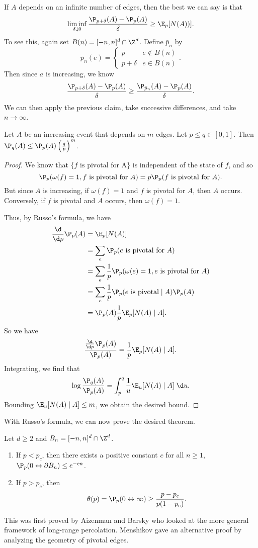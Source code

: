 \documentclass[a4paper]{article}
\begin{document}
If $A$ depends on an infinite number of edges, then the best we can say is that
\[
  \liminf_{\delta \downarrow 0} \frac{\P_{p + \delta}(A) - \P_p(A)}{\delta} \geq \E_p[N(A))].
\]
To see this, again set $B(n) = [-n, n]^d \cap \Z^d$. Define $\bar{p}_n$ by
\[
  \bar{p}_n(e) =
  \begin{cases}
    p & e \not \in B(n)\\
    p + \delta & e \in B(n)
  \end{cases}.
\]
Then since $a$ is increasing, we know
\[
  \frac{\P_{p + \delta}(A) - \P_p(A)}{\delta} \geq \frac{\P_{\bar{p}_n} (A) - \P_p(A)}{\delta}.
\]
We can then apply the previous claim, take successive differences, and take $n \to \infty$.

\begin{cor}
  Let $A$ be an increasing event that depends on $m$ edges. Let $p \leq q \in [0, 1]$. Then $\P_q(A) \leq \P_p(A) \left(\frac{q}{p}\right)^m$.
\end{cor}

\begin{proof}
  We know that $\{f\text{ is pivotal for A}\}$ is independent of the state of $f$, and so
  \[
    \P_p(\omega(f) = 1, f\text{ is pivotal for $A$}) = p\P_p(f\text{ is pivotal for $A$}).
  \]
  But since $A$ is increasing, if $\omega(f) = 1$ and $f$ is pivotal for $A$, then $A$ occurs. Conversely, if $f$ is pivotal and $A$ occurs, then $\omega(f) = 1$.

  Thus, by Russo's formula, we have
  \begin{align*}
    \frac{\d}{\d p} \P_p(A) &= \E_p[N(A)] \\
    &= \sum_e \P_p(e\text{ is pivotal for $A$})\\
    &= \sum_e \frac{1}{p}\P_p(\omega(e) = 1,\text{$e$ is pivotal for $A$})\\
    &= \sum_e \frac{1}{p}\P_p(\text{$e$ is pivotal} \mid A) \P_p(A)\\
    &= \P_p(A) \frac{1}{p} \E_p[N(A) \mid A].
  \end{align*}
  So we have
  \[
    \frac{\frac{\d}{\d p} \P_p(A)}{\P_p(A)} = \frac{1}{p} \E_p[N(A) \mid A].
  \]
  Integrating, we find that
  \[
    \log \frac{\P_q(A)}{\P_p(A)} = \int_{p}^q \frac{1}{u} \E_u[N(A) \mid A]\;\d u.
  \]
  Bounding $\E_u [N(A) \mid A] \leq m$, we obtain the desired bound.
\end{proof}

With Russo's formula, we can now prove the desired theorem.
\begin{thm}
  Let $d \geq 2$ and $B_n = [-n, n]^d \cap \Z^d$.
  \begin{enumerate}
    \item If $p < p_c$, then there exists a positive constant $c$ for all $n \geq 1$, $\P_p(0 \leftrightarrow \partial B_n) \leq e^{-cn}$.
    \item If $p > p_c$, then
      \[
        \theta(p) = \P_p(0 \leftrightarrow \infty) \geq \frac{p - p_c}{p(1 - p_c)}.
      \]
  \end{enumerate}
\end{thm}
This was first proved by Aizenman and Barsky who looked at the more general framework of long-range percolation. Menshikov gave an alternative proof by analyzing the geometry of pivotal edges.
\end{document}
